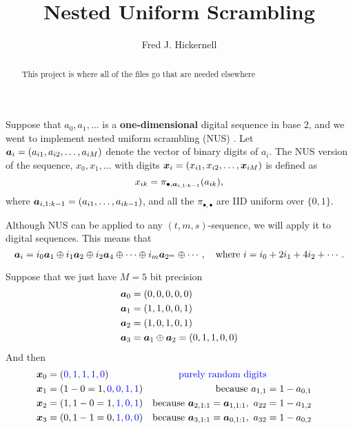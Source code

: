 \documentclass{amsart}
\begin{document}
\title{Nested Uniform Scrambling}
\author{Fred J. Hickernell}
\begin{abstract}This project is where all of the files go that are needed elsewhere
\end{abstract}

\maketitle

Suppose that $a_0, a_1, \ldots$ is a \textbf{one-dimensional} digital sequence in base $2$, and we went to implement nested uniform scrambling (NUS) \cite{Owe95}.  Let $\boldsymbol{a}_i = (a_{i1}, a_{i2}, \ldots, a_{iM})$ denote the  vector of binary digits of $a_i$.  The NUS version of the sequence, $x_0, x_1, \ldots$ with digits $\boldsymbol{x}_i = (x_{i1}, x_{i2}, \ldots, \boldsymbol{x}_{iM})$ is defined as
\begin{equation*}
    x_{ik} = \pi_{\bullet,\boldsymbol{a}_{i,1:k-1}}(a_{ik}),
\end{equation*}
where $\boldsymbol{a}_{i,1:k-1} = (a_{i1}, \ldots, a_{ik-1})$, and all the $\pi_{\bullet,\bullet}$ are IID uniform over $\{0,1\}$.

Although NUS can be applied to any $(t,m,s)$-sequence, we will apply it to digital sequences.  This means that 
\begin{equation*}
    \boldsymbol{a}_i = i_0 \boldsymbol{a}_1 \oplus i_1 \boldsymbol{a}_2 \oplus i_2 \boldsymbol{a}_4 \oplus \cdots \oplus i_m \boldsymbol{a}_{2^m} \oplus \cdots, \quad \text{where } i = i_0  + 2 i_1 + 4 i_2 + \cdots.
\end{equation*}

Suppose that we just have $M = 5$ bit precision
\begin{align*}
    \boldsymbol{a}_0 & = (0, 0,0,0,0) \\
    \boldsymbol{a}_1 & = (1, 1, 0, 0, 1) \\
    \boldsymbol{a}_2 & = (1, 0, 1, 0, 1) \\
    \boldsymbol{a}_3 & = \boldsymbol{a}_1 \oplus \boldsymbol{a}_2 = (0, 1, 1, 0, 0)
\end{align*}
And then
\begin{align*}
    \boldsymbol{x}_0 & = ({\color{blue} 0, 1, 1, 1, 0}) & \text{{\color{blue}purely random digits}}\\
    \boldsymbol{x}_1 & = (1 - 0 = 1, {\color{blue}0, 0, 1, 1}) & \text{because } a_{1,1} &= 1 - a_{0,1}\\
    \boldsymbol{x}_2 & = (1, 1 - 0 = 1, {\color{blue}1, 0, 1}) & \text{because }\boldsymbol{a}_{2,1:1} = \boldsymbol{a}_{1,1:1}, \  a_{22} &= 1 - a_{1,2} \\
    \boldsymbol{x}_3 & = (0, 1-1 = 0, {\color{blue}1, 0, 0}) & \text{because }\boldsymbol{a}_{3,1:1} = \boldsymbol{a}_{0,1:1}, \  a_{32} &= 1 - a_{0,2} \\
\end{align*}
\end{document}
